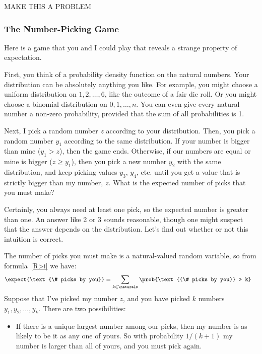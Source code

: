 \begin{editingnotes}

MAKE THIS A PROBLEM

\subsubsection{The Number-Picking Game}

Here is a game that you and I could play that reveals a strange
property of expectation.

First, you think of a probability density function on the natural
numbers.  Your distribution can be absolutely anything you like.  For
example, you might choose a uniform distribution on $1, 2, \dots, 6$,
like the outcome of a fair die roll.  Or you might choose a binomial
distribution on $0, 1, \dots, n$.  You can even give every natural
number a non-zero probability, provided that the sum of all
probabilities is 1.

Next, I pick a random number $z$ according to your distribution.
Then, you pick a random number $y_1$ according to the same
distribution.  If your number is bigger than mine ($y_1 > z$), then
the game ends.  Otherwise, if our numbers are equal or mine is bigger
($z \geq y_1$), then you pick a new number $y_2$ with the same
distribution, and keep picking values $y_3$, $y_4$, etc. until you get
a value that is strictly bigger than my number, $z$.  What is the
expected number of picks that you must make?

Certainly, you always need at least one pick, so the expected number
is greater than one.  An answer like 2 or 3 sounds reasonable, though
one might suspect that the answer depends on the distribution.  Let's
find out whether or not this intuition is correct.

The number of picks you must make is a natural-valued random variable, so
from formula~\eqref{R>i} we have:
\begin{align}
\expect{\text{\# picks by you}}
    & = \sum_{k \in \naturals} \prob{\text{(\# picks by you)} > k} \label{eqn:1}
\end{align}
Suppose that I've picked my number $z$, and you have picked $k$
numbers $y_1, y_2, \dots, y_k$.  There are two possibilities:
%
\begin{itemize}

\item If there is a unique largest number among our picks, then my
number is as likely to be it as any one of yours.  So with probability
$1/(k+1)$ my number is larger than all of yours, and you must pick
again.


\end{itemize}
\end{editingnotes}
